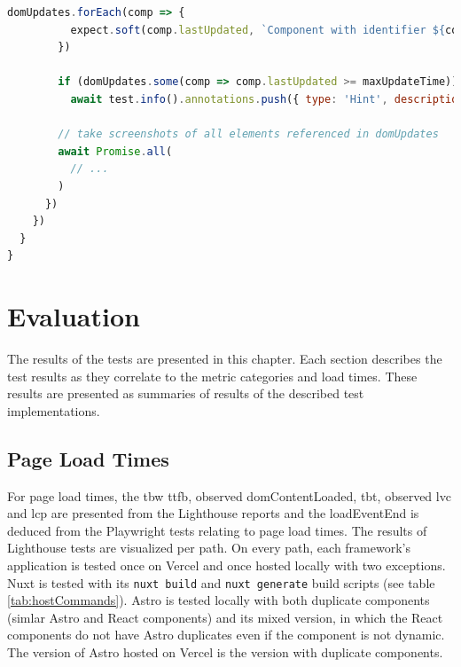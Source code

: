 \documentclass[a4paper, 12pt]{article}
\begin{document}
\begin{lstlisting}[caption={Test file for component update times}, label={lst:state-change-spec}, language=JavaScript, escapechar=°]
        domUpdates.forEach(comp => {
          expect.soft(comp.lastUpdated, `Component with identifier ${comp.id} should finish updates within ${maxUpdateTime} ms`).toBeLessThanOrEqual(maxUpdateTime)
        })

        if (domUpdates.some(comp => comp.lastUpdated >= maxUpdateTime))
          await test.info().annotations.push({ type: 'Hint', description: `Screenshots below show slow updating components` });

        // take screenshots of all elements referenced in domUpdates
        await Promise.all(
          // ...
        )
      })
    })
  }
}
\end{lstlisting}
\vspace{1cm}
  
\section{Evaluation}\label{sec:evaluation}

The results of the tests are presented in this chapter.
Each section describes the test results as they correlate to the metric categories and load times.
These results are presented as summaries of results of the described test implementations.

\subsection{Page Load Times}\label{subsec:pageloadtimes}

For page load times, the \acrshort{tbw} \acrshort{ttfb}, observed domContentLoaded, \acrshort{tbt}, observed \acrshort{lvc} and \acrshort{lcp} are presented from the Lighthouse reports and the loadEventEnd is deduced from the Playwright tests relating to page load times.
The results of Lighthouse tests are visualized per path.
On every path, each framework's application is tested once on Vercel and once hosted locally with two exceptions.
Nuxt is tested with its \verb|nuxt build| and \verb|nuxt generate| build scripts (see table \ref{tab:hostCommands}).
Astro is tested locally with both duplicate components (simlar Astro and React components) and its mixed version, in which the React components do not have Astro duplicates even if the component is not dynamic.
The version of Astro hosted on Vercel is the version with duplicate components.
\end{document}
